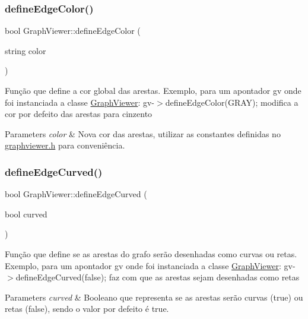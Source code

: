 \subsubsection{\texorpdfstring{define\+Edge\+Color()}{defineEdgeColor()}}
{\footnotesize\ttfamily bool Graph\+Viewer\+::define\+Edge\+Color (\begin{DoxyParamCaption}\item[{string}]{color }\end{DoxyParamCaption})}

Função que define a cor global das arestas. Exemplo, para um apontador gv onde foi instanciada a classe \hyperlink{class_graph_viewer}{Graph\+Viewer}\+: gv-\/$>$define\+Edge\+Color(\+G\+R\+A\+Y); modifica a cor por defeito das arestas para cinzento


\begin{DoxyParams}{Parameters}
{\em color} & Nova cor das arestas, utilizar as constantes definidas no \hyperlink{graphviewer_8h_source}{graphviewer.\+h} para conveniência. \\
\hline
\end{DoxyParams}
\mbox{\label{class_graph_viewer_a08f362be0e682d91e7506dca8caae1b8}} 
\subsubsection{\texorpdfstring{define\+Edge\+Curved()}{defineEdgeCurved()}}
{\footnotesize\ttfamily bool Graph\+Viewer\+::define\+Edge\+Curved (\begin{DoxyParamCaption}\item[{bool}]{curved }\end{DoxyParamCaption})}

Função que define se as arestas do grafo serão desenhadas como curvas ou retas. Exemplo, para um apontador gv onde foi instanciada a classe \hyperlink{class_graph_viewer}{Graph\+Viewer}\+: gv-\/$>$define\+Edge\+Curved(false); faz com que as arestas sejam desenhadas como retas


\begin{DoxyParams}{Parameters}
{\em curved} & Booleano que representa se as arestas serão curvas (true) ou retas (false), sendo o valor por defeito é true. \\
\hline
\end{DoxyParams}
\mbox{\label{class_graph_viewer_af785279b5c204df0e274b20c36276fc3}} 

